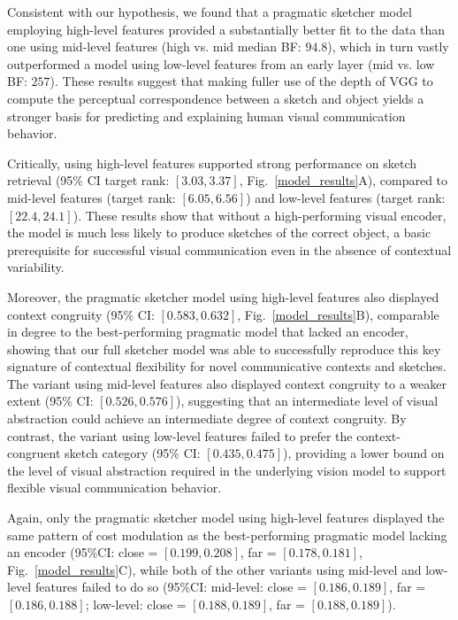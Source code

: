 \documentclass[9pt,twocolumn,twoside]{pnas-new}
\begin{document}
Consistent with our hypothesis, we found that a pragmatic sketcher model employing high-level features provided a substantially better fit to the data than one using mid-level features (high vs. mid median BF: $94.8$), which in turn vastly outperformed a model using low-level features from an early layer (mid vs. low BF: $257$). 
These results suggest that making fuller use of the depth of VGG to compute the perceptual correspondence between a sketch and object yields a stronger basis for predicting and explaining human visual communication behavior.

Critically, using high-level features supported strong performance on sketch retrieval (95\% CI target rank: $[3.03, 3.37]$, Fig.~\ref{model_results}A), compared to mid-level features (target rank: $[6.05, 6.56]$) and low-level features (target rank: $[22.4, 24.1]$). 
These results show that without a high-performing visual encoder, the model is much less likely to produce sketches of the correct object, a basic prerequisite for successful visual communication even in the absence of contextual variability. 

Moreover, the pragmatic sketcher model using high-level features also displayed context congruity (95\% CI: $[0.583, 0.632]$, Fig.~\ref{model_results}B), comparable in degree to the best-performing pragmatic model that lacked an encoder, showing that our full sketcher model was able to successfully reproduce this key signature of contextual flexibility for novel communicative contexts and sketches. 
The variant using mid-level features also displayed context congruity to a weaker extent (95\% CI: $[0.526, 0.576]$), suggesting that an intermediate level of visual abstraction could achieve an intermediate degree of context congruity. 
By contrast, the variant using low-level features failed to prefer the context-congruent sketch category (95\% CI: $[0.435, 0.475]$), providing a lower bound on the level of visual abstraction required in the underlying vision model to support flexible visual communication behavior. 

Again, only the pragmatic sketcher model using high-level features displayed the same pattern of cost modulation as the best-performing pragmatic model lacking an encoder (95\%CI: close = $[0.199, 0.208]$, far = $[0.178, 0.181]$, Fig.~\ref{model_results}C), while both of the other variants using mid-level and low-level features failed to do so (95\%CI: mid-level: close = $[0.186, 0.189]$, far = $[0.186, 0.188]$; low-level: close = $[0.188, 0.189]$, far = $[0.188, 0.189]$).  
\end{document}
